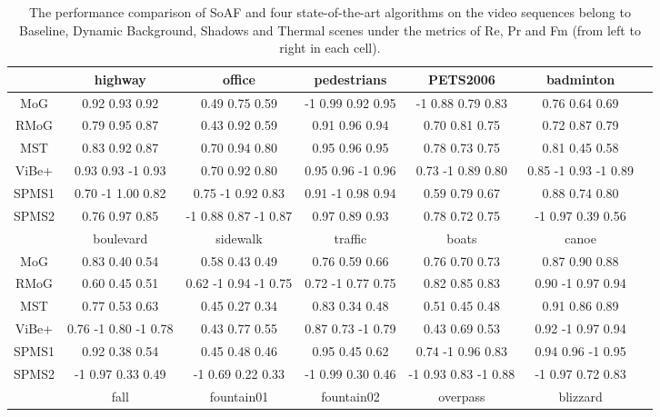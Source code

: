 
\begin{table*}[!t]				%
\caption{The performance comparison of SoAF and four state-of-the-art algorithms on the video sequences belong to Baseline, Dynamic Background, Shadows and Thermal scenes under the metrics of Re, Pr and Fm (from left to right in each cell).}
\label{tab_res}					%
\centering
\begin{tabular*}{\textwidth}{@{\extracolsep{\fill}}ccccccc}
\hline
                & highway 			 & office 			& pedestrians 		& PETS2006  		& badminton  \\
\hline
MoG & 0.92 0.93 0.92 		& 0.49 0.75 0.59 		& -1 0.99 0.92 0.95 	& -1 0.88 0.79 0.83 & 0.76 0.64 0.69 \\
RMoG & 0.79 0.95 0.87 		& 0.43 0.92 0.59 		& 0.91 0.96 0.94 		& 0.70 0.81 0.75 	& 0.72 0.87 0.79 \\
MST & 0.83 0.92 0.87 		& 0.70 0.94 0.80 		& 0.95 0.96 0.95 		& 0.78 0.73 0.75 	& 0.81 0.45 0.58 \\
ViBe+ & 0.93 0.93 -1  0.93 	& 0.70 0.92 0.80 		& 0.95 0.96 -1 0.96 	& 0.73 -1 0.89 0.80 & 0.85 -1 0.93 -1 0.89 \\
\hline
SPMS1 & 0.70 -1 1.00 0.82 	& 0.75 -1 0.92 0.83 	& 0.91 -1 0.98 0.94 	& 0.59 0.79 0.67 	& 0.88 0.74 0.80 \\
SPMS2 & 0.76 0.97 0.85 		& -1  0.88 0.87 -1 0.87 & 0.97 0.89 0.93 		& 0.78 0.72 0.75 	& -1 0.97 0.39 0.56 \\
\hline
\hline
                & boulevard 			 & sidewalk 			& traffic 		& boats  & canoe  \\
\hline
MoG 	& 0.83 0.40 0.54 		& 0.58 0.43 0.49 		& 0.76 0.59 0.66 	& 0.76 0.70 0.73 		& 0.87 0.90 0.88 \\
RMoG 	& 0.60 0.45 0.51 		& 0.62 -1 0.94 -1 0.75 	& 0.72 -1 0.77 0.75 & 0.82 0.85 0.83 		& 0.90 -1 0.97 0.94 \\
MST 	& 0.77 0.53 0.63 		& 0.45 0.27 0.34 		& 0.83 0.34 0.48 	& 0.51 0.45 0.48 		& 0.91 0.86 0.89 \\
ViBe+ 	& 0.76 -1 0.80 -1 0.78 	& 0.43 0.77 0.55 		& 0.87 0.73 -1 0.79 & 0.43 0.69 0.53 		& 0.92 -1 0.97 0.94 \\
\hline
SPMS1 	& 0.92 0.38 0.54 		& 0.45 0.48 0.46 		& 0.95 0.45 0.62 	& 0.74 -1 0.96 0.83 	& 0.94 0.96 -1 0.95 \\
SPMS2 	& -1 0.97 0.33 0.49 	& -1 0.69 0.22 0.33 	& -1 0.99 0.30 0.46 & -1 0.93 0.83 -1 0.88 	& -1 0.97 0.72 0.83 \\
\hline
\hline
                & fall 			 &  	fountain01		&   fountain02 		&  overpass &  blizzard\\

\end{tabular*}
\end{table*}
